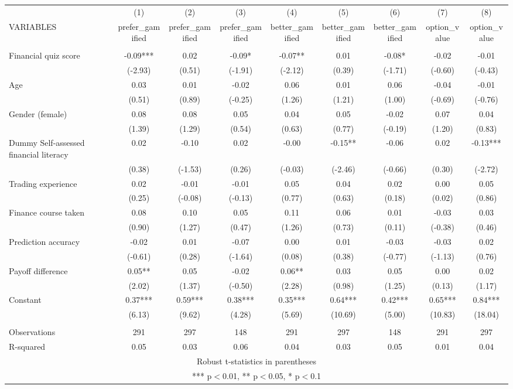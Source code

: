 \documentclass[]{article}
\begin{document}
\begin{tabular}{lcccccccc} \hline
 & (1) & (2) & (3) & (4) & (5) & (6) & (7) & (8) \\
VARIABLES & prefer\_gamified & prefer\_gamified & prefer\_gamified & better\_gamified & better\_gamified & better\_gamified & option\_value & option\_value \\ \hline
 &  &  &  &  &  &  &  &  \\
Financial quiz score & -0.09*** & 0.02 & -0.09* & -0.07** & 0.01 & -0.08* & -0.02 & -0.01 \\
 & (-2.93) & (0.51) & (-1.91) & (-2.12) & (0.39) & (-1.71) & (-0.60) & (-0.43) \\
Age & 0.03 & 0.01 & -0.02 & 0.06 & 0.01 & 0.06 & -0.04 & -0.01 \\
 & (0.51) & (0.89) & (-0.25) & (1.26) & (1.21) & (1.00) & (-0.69) & (-0.76) \\
Gender (female) & 0.08 & 0.08 & 0.05 & 0.04 & 0.05 & -0.02 & 0.07 & 0.04 \\
 & (1.39) & (1.29) & (0.54) & (0.63) & (0.77) & (-0.19) & (1.20) & (0.83) \\
Dummy Self-assessed financial literacy & 0.02 & -0.10 & 0.02 & -0.00 & -0.15** & -0.06 & 0.02 & -0.13*** \\
 & (0.38) & (-1.53) & (0.26) & (-0.03) & (-2.46) & (-0.66) & (0.30) & (-2.72) \\
Trading experience & 0.02 & -0.01 & -0.01 & 0.05 & 0.04 & 0.02 & 0.00 & 0.05 \\
 & (0.25) & (-0.08) & (-0.13) & (0.77) & (0.63) & (0.18) & (0.02) & (0.86) \\
Finance course taken & 0.08 & 0.10 & 0.05 & 0.11 & 0.06 & 0.01 & -0.03 & 0.03 \\
 & (0.90) & (1.27) & (0.47) & (1.26) & (0.73) & (0.11) & (-0.38) & (0.46) \\
Prediction accuracy & -0.02 & 0.01 & -0.07 & 0.00 & 0.01 & -0.03 & -0.03 & 0.02 \\
 & (-0.61) & (0.28) & (-1.64) & (0.08) & (0.38) & (-0.77) & (-1.13) & (0.76) \\
Payoff difference & 0.05** & 0.05 & -0.02 & 0.06** & 0.03 & 0.05 & 0.00 & 0.02 \\
 & (2.02) & (1.37) & (-0.50) & (2.28) & (0.98) & (1.25) & (0.13) & (1.17) \\
Constant & 0.37*** & 0.59*** & 0.38*** & 0.35*** & 0.64*** & 0.42*** & 0.65*** & 0.84*** \\
 & (6.13) & (9.62) & (4.28) & (5.69) & (10.69) & (5.00) & (10.83) & (18.04) \\
 &  &  &  &  &  &  &  &  \\
Observations & 291 & 297 & 148 & 291 & 297 & 148 & 291 & 297 \\
 R-squared & 0.05 & 0.03 & 0.06 & 0.04 & 0.03 & 0.05 & 0.01 & 0.04 \\ \hline
\multicolumn{9}{c}{ Robust t-statistics in parentheses} \\
\multicolumn{9}{c}{ *** p$<$0.01, ** p$<$0.05, * p$<$0.1} \\
\end{tabular}
\end{document}
